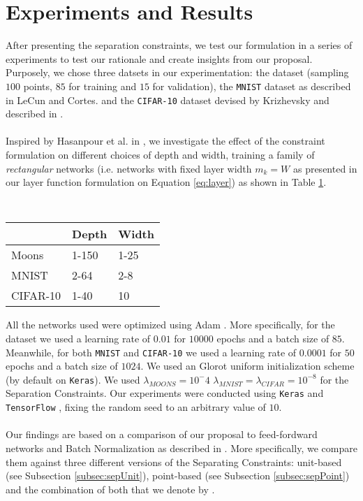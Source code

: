 \section{Experiments and Results}\label{sec:experiments}
After presenting the separation constraints, we test our formulation in a series of experiments to test our rationale and create insights from our proposal. Purposely, we chose three datsets in our experimentation: the \moons dataset (sampling $100$ points, $85$ for training and $15$ for validation), the \texttt{MNIST} dataset as described in LeCun and Cortes. \cite{mnist} and the \texttt{CIFAR-10} dataset devised by Krizhevsky and described in \cite{cifar10}.
\\\\
Inspired by Hasanpour et al. in \cite{simpnet}, we investigate the effect of the constraint formulation on different choices of depth and width, training a family of \emph{rectangular} networks (i.e. networks with fixed layer width $m_k=W$ as presented in our layer function formulation on Equation \ref{eq:layer}) as shown in Table \ref{tab:grids}.
\\\\

\begin{table}[]
\centering
\begin{tabular}{@{}lll@{}}
\toprule
         & Depth & Width \\ \midrule
Moons    & 1-150 & 1-25  \\
MNIST    & 2-64  & 2-8   \\
CIFAR-10 & 1-40  & 10    \\ \bottomrule
\end{tabular}
\caption{}\label{tab:grids}
\end{table}

All the networks used were optimized using Adam \cite{adam}. More specifically, for the \moons dataset we used a learning rate of $0.01$ for $10000$ epochs and a batch size of $85$. Meanwhile, for both \texttt{MNIST} and \texttt{CIFAR-10} we used a learning rate of $0.0001$ for $50$ epochs and a batch size of $1024$. We used an Glorot uniform initialization scheme \cite{Glorot10Initialization} (by default on \texttt{Keras}). We used $\lambda_{MOONS}=10^-4$ $\lambda_{MNIST}=\lambda_{CIFAR}=10^{-8}$ for the Separation Constraints. Our experiments were conducted using \texttt{Keras} \cite{keras} and \texttt{TensorFlow} \cite{tensorflow}, fixing the random seed to an arbitrary value of $10$. 
\\\\
Our findings are based on a comparison of our proposal to feed-fordward \ReLU networks \cite{relu} and Batch Normalization as described in \cite{batchnorm}. More specifically, we compare them against three different versions of the Separating Constraints: unit-based \SepUnit (see Subsection \ref{subsec:sepUnit}), point-based \SepPoint (see Subsection \ref{subsec:sepPoint}) and the combination of both that we denote by \SepUnitPoint.
\\\\


